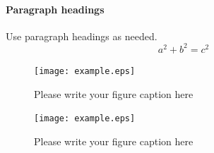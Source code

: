 \paragraph{Paragraph headings} Use paragraph headings as needed.
\begin{equation}
a^2+b^2=c^2
\end{equation}

\begin{figure}
  \texttt{[image: example.eps]}
\caption{Please write your figure caption here}
\label{fig:1}       %
\end{figure}
%
\begin{figure}
  \texttt{[image: example.eps]}
\caption{Please write your figure caption here}
\label{fig:2}       %
\end{figure}
%


